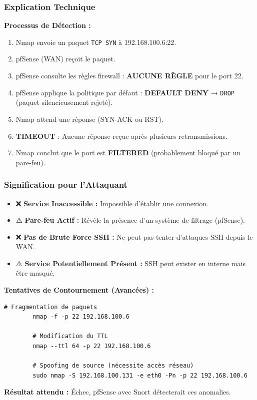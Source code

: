 \documentclass[12pt,a4paper,openany]{report}
\begin{document}
	\subsubsection{Explication Technique}
	\textbf{Processus de Détection :}
	\begin{enumerate}
		\item Nmap envoie un paquet \texttt{TCP SYN} à 192.168.100.6:22.
		\item pfSense (WAN) reçoit le paquet.
		\item pfSense consulte les règles firewall : \textbf{AUCUNE RÈGLE} pour le port 22.
		\item pfSense applique la politique par défaut : \textbf{DEFAULT DENY} → \texttt{DROP} (paquet silencieusement rejeté).
		\item Nmap attend une réponse (SYN-ACK ou RST).
		\item \textbf{TIMEOUT} : Aucune réponse reçue après plusieurs retransmissions.
		\item Nmap conclut que le port est \textbf{FILTERED} (probablement bloqué par un pare-feu).
	\end{enumerate}
	
	\subsubsection{Signification pour l'Attaquant}
	\begin{itemize}
		\item ❌ \textbf{Service Inaccessible :} Impossible d'établir une connexion.
		\item ⚠️ \textbf{Pare-feu Actif :} Révèle la présence d'un système de filtrage (pfSense).
		\item ❌ \textbf{Pas de Brute Force SSH :} Ne peut pas tenter d'attaques SSH depuis le WAN.
		\item ⚠️ \textbf{Service Potentiellement Présent :} SSH peut exister en interne mais être masqué.
	\end{itemize}
	
	\textbf{Tentatives de Contournement (Avancées) :}
	\begin{lstlisting}[caption=Techniques d'évasion (peu probables de réussir ici)]
		# Fragmentation de paquets
		nmap -f -p 22 192.168.100.6
		
		# Modification du TTL
		nmap --ttl 64 -p 22 192.168.100.6
		
		# Spoofing de source (nécessite accès réseau)
		sudo nmap -S 192.168.100.131 -e eth0 -Pn -p 22 192.168.100.6
	\end{lstlisting}
	\textbf{Résultat attendu :} Échec, pfSense avec Snort détecterait ces anomalies.
	
\end{document}
